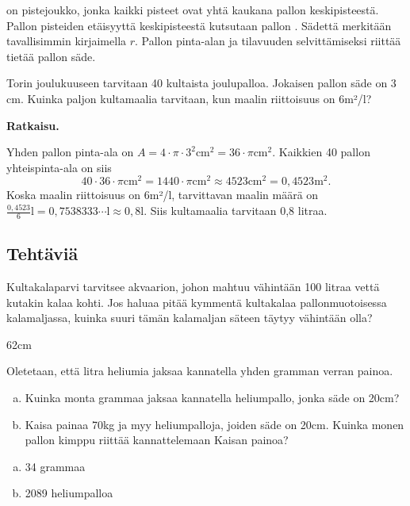  on pistejoukko, jonka kaikki pisteet ovat yhtä kaukana pallon keskipisteestä. Pallon pisteiden etäisyyttä keskipisteestä kutsutaan pallon . Sädettä merkitään tavallisimmin kirjaimella $r$. Pallon pinta-alan ja tilavuuden selvittämiseksi riittää tietää pallon säde.


\begin{esimerkki}
Torin joulukuuseen tarvitaan 40 kultaista joulupalloa. Jokaisen pallon säde on 3 cm. Kuinka paljon kultamaalia tarvitaan, kun maalin riittoisuus on 6m²/l?

\textbf{Ratkaisu.}

Yhden pallon pinta-ala on $A= 4 \cdot \pi \cdot 3^2 \text{cm}^2=36\cdot \pi \text{cm}^2$. Kaikkien 40 pallon yhteispinta-ala on siis
$$40 \cdot 36 \cdot \pi \text{cm}^2 = 1440 \cdot \pi \text{cm}^2 \approx 4523 \text{cm}^2 =0,4523 \text{m}^2.$$
Koska maalin riittoisuus on 6m²/l, tarvittavan maalin määrä on $\frac{0,4523}{6}\text{l}=0,7538333 \cdots \text{l} \approx 0,8\text{l}$.
Siis kultamaalia tarvitaan 0,8 litraa.
\end{esimerkki}

\subsection*{Tehtäviä}

\begin{tehtava}
Kultakalaparvi tarvitsee akvaarion, johon mahtuu vähintään 100 litraa vettä kutakin kalaa kohti. Jos haluaa pitää kymmentä kultakalaa pallonmuotoisessa kalamaljassa, kuinka suuri tämän kalamaljan säteen täytyy vähintään olla?
\begin{vastaus}
62cm
\end{vastaus}
\end{tehtava}

\begin{tehtava}
Oletetaan, että litra heliumia jaksaa kannatella yhden gramman verran painoa.
\begin{enumerate}[a)]
\item Kuinka monta grammaa jaksaa kannatella heliumpallo, jonka säde on 20cm?
\item Kaisa painaa 70kg ja myy heliumpalloja, joiden säde on 20cm. Kuinka monen pallon kimppu riittää kannattelemaan Kaisan painoa?
\end{enumerate}
\begin{vastaus}
\begin{enumerate}[a)]
\item 34 grammaa
\item 2089 heliumpalloa
\end{enumerate}
\end{vastaus}
\end{tehtava}

